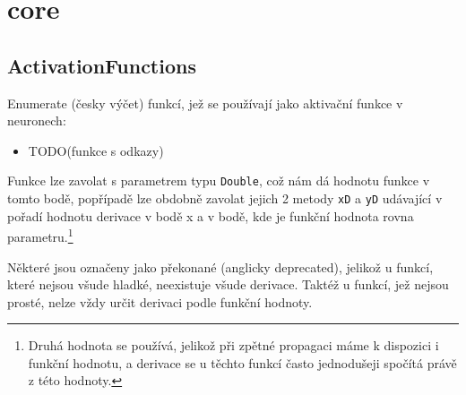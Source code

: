 \documentclass[12pt]{report}			%
\begin{document}
			\section{core}
			
				\subsection{ActivationFunctions}
					Enumerate (česky výčet) funkcí, jež se používají jako aktivační funkce v neuronech:
					\begin{itemize}
						\item TODO(funkce s odkazy)
					\end{itemize}
					Funkce lze zavolat s parametrem typu \verb!Double!, což nám dá hodnotu funkce v tomto bodě, popřípadě lze obdobně zavolat jejich 2 metody \verb!xD! a \verb!yD! udávající v pořadí hodnotu derivace v bodě x a v bodě, kde je funkční hodnota rovna parametru.\footnote{Druhá hodnota se používá, jelikož při zpětné propagaci máme k dispozici i funkční hodnotu, a derivace se u těchto funkcí často jednodušeji spočítá právě z této hodnoty.}
					
					Některé jsou označeny jako překonané (anglicky deprecated), jelikož u funkcí, které nejsou všude hladké, neexistuje všude derivace. Taktéž u funkcí, jež nejsou prosté, nelze vždy určit derivaci podle funkční hodnoty.
			
\end{document}
